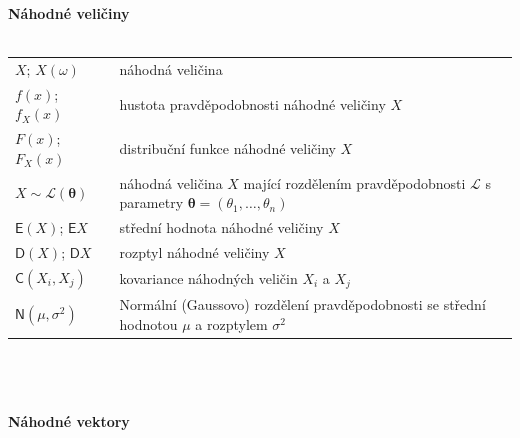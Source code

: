 \documentclass[a4paper,12pt]{report}
\theoremstyle{definition} \newtheorem{definice}[veta]{Definice}
\theoremstyle{remark}
\begin{document}
%
%
%
\textbf{Náhodné veličiny}\\\\
   \begin{tabular}{p{4cm} p{9.3cm}}
   $X$; $X(\omega)$                                                 &   náhodná veličina \\
   $f(x)$; $f_X(x)$                                               &   hustota pravděpodobnosti náhodné veličiny $X$ \\ %
   $F(x)$; $F_X(x)$				 &  distribuční funkce náhodné veličiny $X$ \\
   $X\sim \mathcal{L}(\boldsymbol{\theta})$                                &   náhodná veličina $X$ mající rozdělením pravděpodobnosti $\mathcal{L}$ s parametry  $\boldsymbol{\theta}=(\theta_1,\ldots,\theta_n)$ \\ %
   $\mathsf{E}(X)$;  $\mathsf{E}X$                         	      &   střední hodnota náhodné veličiny $X$ \\
   $\mathsf{D}(X)$;  $\mathsf{D}X$                       	      &   rozptyl náhodné veličiny $X$ \\
   $\mathsf{C}(X_i,X_j)$             		      &   kovariance náhodných veličin $X_i$ a $X_j$\\
   $\mathsf{N}(\mu, \sigma^{2})$                      &   Normální (Gaussovo) rozdělení pravděpodobnosti se střední hodnotou $\mu$ a rozptylem $\sigma^2$  \\
   \end{tabular}\\\\\\
%
%
\textbf{Náhodné vektory}\\\\
\end{document}
